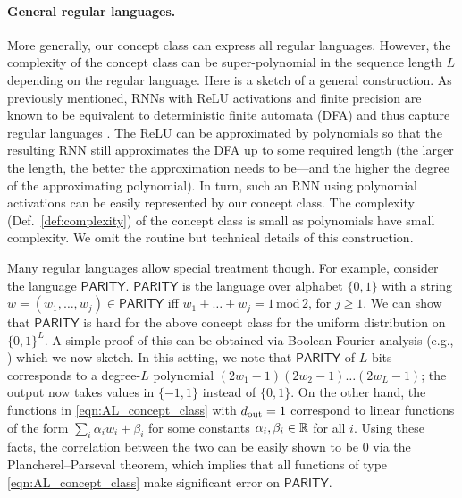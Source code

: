 \paragraph{General regular languages.} More generally, our concept class can express all regular languages. However, the complexity of the concept class can be super-polynomial in the sequence length $L$ depending on the regular language. Here is a sketch of a general construction.
As previously mentioned, RNNs with ReLU activations and finite precision are known to be equivalent to deterministic finite automata (DFA) and thus capture regular languages \cite{korsky2019computational}. 
    The ReLU can be approximated by polynomials \cite{lorentz} so that the resulting RNN still approximates the DFA up to some required length (the larger the length, the better the approximation needs to be---and the higher the degree of the approximating polynomial). In turn, such an RNN using polynomial activations can be easily represented by our concept class. The complexity (Def.~\ref{def:complexity}) of the concept class is small as polynomials have small complexity. We omit the routine but technical details of this construction. 
    
    Many regular languages allow special treatment though. For example, consider the language $\mathsf{PARITY}$. $\mathsf{PARITY}$ is the language over alphabet $\{0, 1\}$ with a string $w = (w_1, \ldots, w_j) \in \mathsf{PARITY}$ iff
$w_1+\ldots +w_j = 1 \,\mathrm{mod}\, 2$, for $j \geq 1$. We can show that $\mathsf{PARITY}$ is hard for the above concept class for the uniform distribution on $\{0,1\}^L$. A simple proof of this can be obtained via Boolean Fourier analysis (e.g., \cite{odonnell}) which we now sketch. In this setting, 
we note that $\mathsf{PARITY}$ of $L$ bits corresponds to a degree-$L$ polynomial $(2 w_1 -1 )(2w_2 -1)\ldots (2w_L-1)$; the output now takes values in $\{-1, 1\}$ instead of $\{0, 1\}$. On the other hand, the functions in \eqref{eqn:AL_concept_class} with $d_{\mathrm{out}}=1$ correspond to linear functions of the form $\sum_i \alpha_i w_i + \beta_i$ for some constants $\alpha_i, \beta_i \in \mathbb{R}$ for all $i$. Using these facts, the correlation between the two can be easily shown to be $0$ via the Plancherel--Parseval theorem, which implies that all functions of type \eqref{eqn:AL_concept_class} make significant error on $\mathsf{PARITY}$. 

